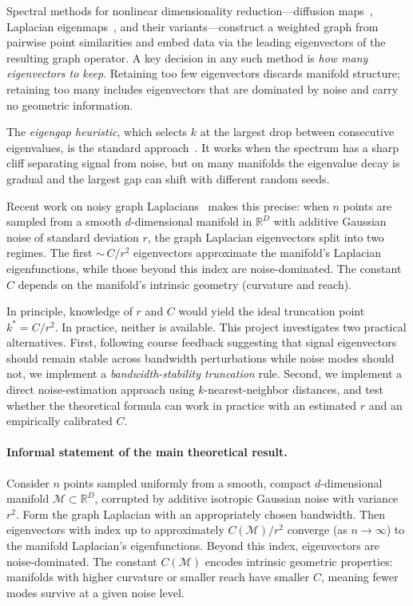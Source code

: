 \documentclass{article}
\begin{document}
Spectral methods for nonlinear dimensionality reduction---diffusion maps~\citep{coifman2006diffusion}, Laplacian eigenmaps~\citep{belkin2003laplacian}, and their variants---construct a weighted graph from pairwise point similarities and embed data via the leading eigenvectors of the resulting graph operator. A key decision in any such method is \emph{how many eigenvectors to keep}. Retaining too few eigenvectors discards manifold structure; retaining too many includes eigenvectors that are dominated by noise and carry no geometric information.

The \emph{eigengap heuristic}, which selects $k$ at the largest drop between consecutive eigenvalues, is the standard approach~\citep{vonluxburg2007tutorial}. It works when the spectrum has a sharp cliff separating signal from noise, but on many manifolds the eigenvalue decay is gradual and the largest gap can shift with different random seeds.

Recent work on noisy graph Laplacians~\citep{elkaroui2016connection} makes this precise: when $n$ points are sampled from a smooth $d$-dimensional manifold in $\mathbb{R}^D$ with additive Gaussian noise of standard deviation $r$, the graph Laplacian eigenvectors split into two regimes. The first ${\sim}\, C/r^2$ eigenvectors approximate the manifold's Laplacian eigenfunctions, while those beyond this index are noise-dominated. The constant $C$ depends on the manifold's intrinsic geometry (curvature and reach).

In principle, knowledge of $r$ and $C$ would yield the ideal truncation point $k^* = C/r^2$. In practice, neither is available. This project investigates two practical alternatives. First, following course feedback suggesting that signal eigenvectors should remain stable across bandwidth perturbations while noise modes should not, we implement a \emph{bandwidth-stability truncation} rule. Second, we implement a direct noise-estimation approach using $k$-nearest-neighbor distances, and test whether the theoretical formula can work in practice with an estimated $r$ and an empirically calibrated $C$.

\paragraph{Informal statement of the main theoretical result.}
Consider $n$ points sampled uniformly from a smooth, compact $d$-dimensional manifold $\mathcal{M} \subset \mathbb{R}^D$, corrupted by additive isotropic Gaussian noise with variance $r^2$. Form the graph Laplacian with an appropriately chosen bandwidth. Then eigenvectors with index up to approximately $C(\mathcal{M})/r^2$ converge (as $n \to \infty$) to the manifold Laplacian's eigenfunctions. Beyond this index, eigenvectors are noise-dominated. The constant $C(\mathcal{M})$ encodes intrinsic geometric properties: manifolds with higher curvature or smaller reach have smaller $C$, meaning fewer modes survive at a given noise level.
\end{document}
